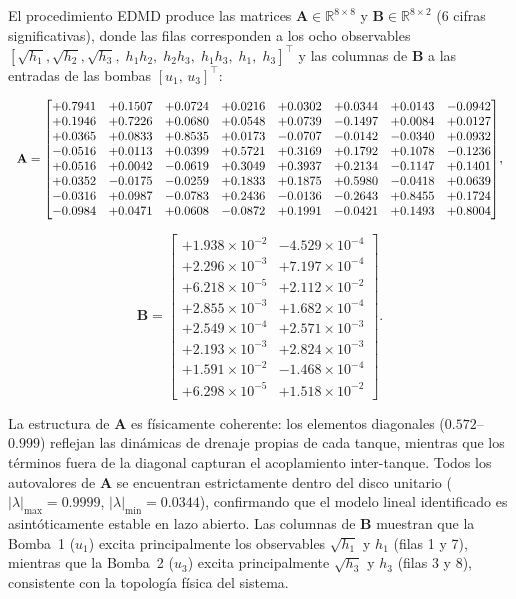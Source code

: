 \documentclass[12pt,letterpaper]{article}
\begin{document}
El procedimiento EDMD produce las matrices $\mathbf{A} \in \mathbb{R}^{8\times8}$
y $\mathbf{B} \in \mathbb{R}^{8\times2}$ (6 cifras significativas), donde las
filas corresponden a los ocho observables
$[\sqrt{h_1},\sqrt{h_2},\sqrt{h_3},\;h_1h_2,\;h_2h_3,\;h_1h_3,\;h_1,\;h_3]^\top$
y las columnas de $\mathbf{B}$ a las entradas de las bombas $[u_1,\,u_3]^\top$:

\begin{equation}
\resizebox{\textwidth}{!}{$
\mathbf{A} =
\begin{bmatrix}
+0.7941 & +0.1507 & +0.0724 & +0.0216 & +0.0302 & +0.0344 & +0.0143 & -0.0942 \\
+0.1946 & +0.7226 & +0.0680 & +0.0548 & +0.0739 & -0.1497 & +0.0084 & +0.0127 \\
+0.0365 & +0.0833 & +0.8535 & +0.0173 & -0.0707 & -0.0142 & -0.0340 & +0.0932 \\
-0.0516 & +0.0113 & +0.0399 & +0.5721 & +0.3169 & +0.1792 & +0.1078 & -0.1236 \\
+0.0516 & +0.0042 & -0.0619 & +0.3049 & +0.3937 & +0.2134 & -0.1147 & +0.1401 \\
+0.0352 & -0.0175 & -0.0259 & +0.1833 & +0.1875 & +0.5980 & -0.0418 & +0.0639 \\
-0.0316 & +0.0987 & -0.0783 & +0.2436 & -0.0136 & -0.2643 & +0.8455 & +0.1724 \\
-0.0984 & +0.0471 & +0.0608 & -0.0872 & +0.1991 & -0.0421 & +0.1493 & +0.8004
\end{bmatrix}$},
\label{eq:A_matrix}
\end{equation}

\begin{equation}
\mathbf{B} =
\begin{bmatrix}
+1.938\times10^{-2} & -4.529\times10^{-4} \\
+2.296\times10^{-3} & +7.197\times10^{-4} \\
+6.218\times10^{-5} & +2.112\times10^{-2} \\
+2.855\times10^{-3} & +1.682\times10^{-4} \\
+2.549\times10^{-4} & +2.571\times10^{-3} \\
+2.193\times10^{-3} & +2.824\times10^{-3} \\
+1.591\times10^{-2} & -1.468\times10^{-4} \\
+6.298\times10^{-5} & +1.518\times10^{-2}
\end{bmatrix}.
\label{eq:B_matrix}
\end{equation}

La estructura de $\mathbf{A}$ es físicamente coherente: los
elementos diagonales ($0.572$--$0.999$) reflejan las dinámicas de
drenaje propias de cada tanque, mientras que los términos
fuera de la diagonal capturan el acoplamiento inter-tanque.
Todos los autovalores de $\mathbf{A}$ se encuentran estrictamente
dentro del disco unitario
($|\lambda|_{\max}=0.9999$, $|\lambda|_{\min}=0.0344$),
confirmando que el modelo lineal identificado es asintóticamente
estable en lazo abierto.
Las columnas de $\mathbf{B}$ muestran que la Bomba~1 ($u_1$)
excita principalmente los observables $\sqrt{h_1}$ y $h_1$
(filas 1 y 7), mientras que la Bomba~2 ($u_3$) excita
principalmente $\sqrt{h_3}$ y $h_3$ (filas 3 y 8), consistente
con la topología física del sistema.
\end{document}
